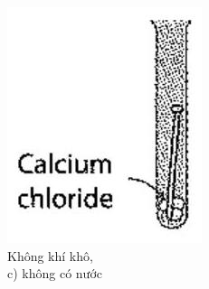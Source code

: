 \documentclass[10pt]{article}
\begin{document}
\begin{figure}[h]
\begin{center}
  \includegraphics[width=\textwidth]{2025_10_23_74efce88ce3a451fd6b0g-072(2)}
\captionsetup{labelformat=empty}
\caption{Không khí khô,\\
c) không có nước}
\end{center}
\end{figure}
\end{document}
